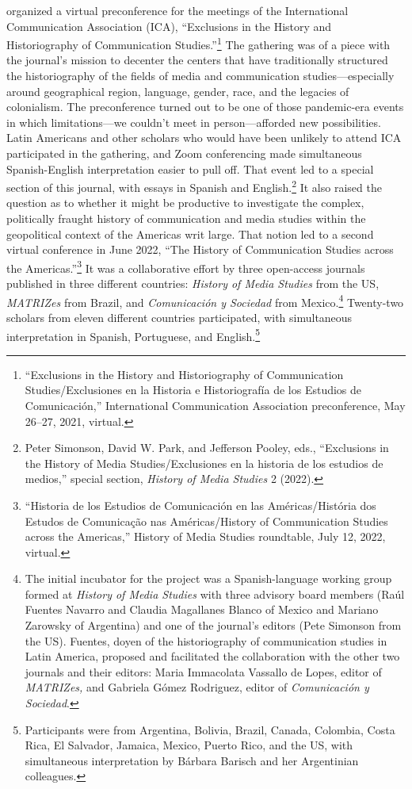 \documentclass{tufte-handout}
\begin{document}
\noindent organized a virtual preconference for the meetings of the International
Communication Association (ICA), ``Exclusions in the History and
Historiography of Communication Studies.''\footnote{``Exclusions in the
  History and Historiography of Communication Studies/Exclusiones en la
  Historia e Historiografía de los Estudios de Comunicación,''
  International Communication Association preconference, May 26--27,
  2021, virtual.} The gathering was of a piece with the journal's
mission to decenter the centers that have traditionally structured the
historiography of the fields of media and communication
studies---especially around geographical region, language, gender, race,
and the legacies of colonialism. The preconference turned out to be one
of those pandemic-era events in which limitations---we couldn't meet in
person---afforded new possibilities. Latin Americans and other scholars
who would have been unlikely to attend ICA participated in the
gathering, and Zoom conferencing made simultaneous Spanish-English
interpretation easier to pull off. That event led to a special section
of this journal, with essays in Spanish and English.\footnote{Peter
  Simonson, David W. Park, and Jefferson Pooley, eds., ``Exclusions in
  the History of Media Studies/Exclusiones en la historia de los
  estudios de medios,'' special section, \emph{History of Media Studies}
  2 (2022).} It also raised the question as to whether it might be
productive to investigate the complex, politically fraught history of
communication and media studies within the geopolitical context of the
Americas writ large. That notion led to a second virtual conference in
June 2022, ``The History of Communication Studies across the
Americas.''\footnote{``Historia de los Estudios de Comunicación en las
  Américas/História dos Estudos de Comunicação nas Américas/History of
  Communication Studies across the Americas,'' History of Media Studies
  roundtable, July 12, 2022, virtual.} It was a collaborative effort by
three open-access journals published in three different countries:
\emph{History of Media Studies} from the US, \emph{MATRIZes} from
Brazil, and \emph{Comunicación y Sociedad} from Mexico.\footnote{The
  initial incubator for the project was a Spanish-language working group
  formed at \emph{History of Media Studies} with three advisory board
  members (Raúl Fuentes Navarro and Claudia Magallanes Blanco of Mexico
  and Mariano Zarowsky of Argentina) and one of the journal's editors
  (Pete Simonson from the US). Fuentes, doyen of the historiography of
  communication studies in Latin America, proposed and facilitated the
  collaboration with the other two journals and their editors: Maria
  Immacolata Vassallo de Lopes, editor of \emph{MATRIZes,} and Gabriela
  Gómez Rodriguez, editor of \emph{Comunicación y Sociedad}.} Twenty-two
scholars from eleven different countries participated, with simultaneous
interpretation in Spanish, Portuguese, and English.\footnote{Participants
  were from Argentina, Bolivia, Brazil, Canada, Colombia, Costa Rica, El
  Salvador, Jamaica, Mexico, Puerto Rico, and the US, with simultaneous
  interpretation by Bárbara Barisch and her Argentinian colleagues.}
\end{document}
